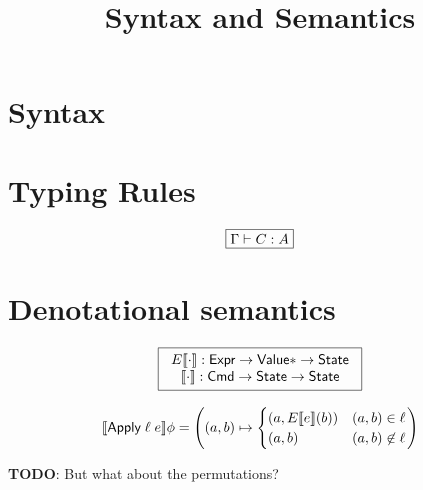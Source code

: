 \documentclass[runningheads]{llncs}
\newcommand {\ra} {\rightarrow}
\newcommand {\State} {\textsf{State}}
\newcommand {\Value} {\textsf{Value}}
\newcommand {\sem} [1] {\llbracket #1 \rrbracket}
\newcommand {\Esem} [1] {E\sem{#1}}
\newcommand {\Expr} {\textsf{Expr}}
\newcommand {\Cmd} {\textsf{Cmd}}
\newcommand {\Apply} {\textsf{Apply}}
\begin{document}
\title{Syntax and Semantics}
\author{}
\institute{}
\maketitle

\section{Syntax}

\section{Typing Rules}

\[
  \begin{array}{c}
    \fbox{$\Gamma \vdash C : A$}
  \end{array}
\]

\section{Denotational semantics}

\[
  \begin{array}{c}
    \fbox{\begin{tabular}{c} $\Esem{\cdot} : \Expr \ra \Value* \ra \State$\\ $\sem{\cdot} : \Cmd \ra \State \ra \State$\end{tabular}}\\\\
      \sem{\Apply\;\ell\;e}\phi = \left((a, b) \mapsto
             \begin{cases}
               (a, \Esem{e}(b)) & (a, b) \in \ell\\
               (a, b) & (a, b) \not\in \ell
             \end{cases}\right)
  \end{array}
\]

\textbf{TODO}: But what about the permutations?
\end{document}
